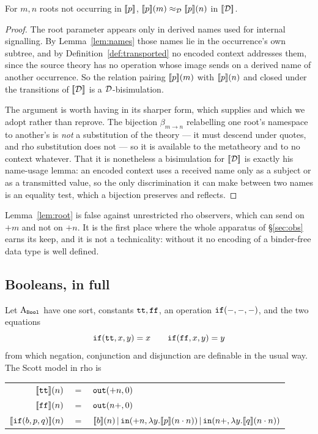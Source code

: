 \documentclass{article}
\begin{document}
\begin{lemma}
\label{lem:root}
    For $m,n$ roots not occurring in $[\![p]\!]$, $[\![p]\!](m)\approx_{\mathcal{D}}[\![p]\!](n)$ in $[\![\mathcal{D}]\!]$.
\end{lemma}
\begin{proof}
    The root parameter appears only in derived names used for internal signalling. By Lemma~\ref{lem:names} those names lie in the occurrence's own subtree, and by Definition~\ref{def:transported} no encoded context addresses them, since the source theory has no operation whose image sends on a derived name of another occurrence. So the relation pairing $[\![p]\!](m)$ with $[\![p]\!](n)$ and closed under the transitions of $[\![\mathcal{D}]\!]$ is a $\mathcal{D}$-bisimulation.

    The argument is worth having in its sharper form, which \citet{nowns} supplies and which we adopt rather than reprove. The bijection $\beta_{m\to n}$ relabelling one root's namespace to another's is \emph{not} a substitution of the theory --- it must descend under quotes, and rho substitution does not --- so it is available to the metatheory and to no context whatever. That it is nonetheless a bisimulation for $[\![\mathcal{D}]\!]$ is exactly his name-usage lemma: an encoded context uses a received name only as a subject or as a transmitted value, so the only discrimination it can make between two names is an equality test, which a bijection preserves and reflects.
\end{proof}

Lemma~\ref{lem:root} is false against unrestricted rho observers, which can send on $+m$ and not on $+n$. It is the first place where the whole apparatus of \S\ref{sec:obs} earns its keep, and it is not a technicality: without it no encoding of a binder-free data type is well defined.

\subsection{Booleans, in full}
\label{sec:bool}

Let $\mathrm{A}_{\mathtt{Bool}}$ have one sort, constants $\mathtt{tt},\mathtt{ff}$, an operation $\mathtt{if}(-,-,-)$, and the two equations
\[\mathtt{if}(\mathtt{tt},x,y)=x\qquad \mathtt{if}(\mathtt{ff},x,y)=y\]
from which negation, conjunction and disjunction are definable in the usual way. The Scott model in rho is
\begin{center}
\renewcommand{\arraystretch}{1.3}
\begin{tabular}{rcl}
    $[\![\mathtt{tt}]\!](n)$ & $=$ & $\mathtt{out}(+n,0)$\\
    $[\![\mathtt{ff}]\!](n)$ & $=$ & $\mathtt{out}(n+,0)$\\
    $[\![\mathtt{if}(b,p,q)]\!](n)$ & $=$ & $[\![b]\!](n)\,|\, \mathtt{in}(+n,\lambda y.[\![p]\!](n\cdot n))\,|\,\mathtt{in}(n+,\lambda y.[\![q]\!](n\cdot n))$
\end{tabular}
\end{center}
\end{document}
